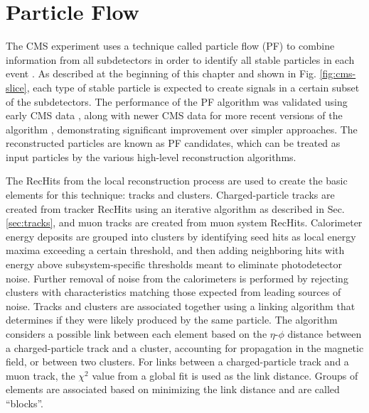 \documentclass[12pt]{thesis}  %
\begin{document}
\section{Particle Flow
\label{sec:particle-flow}}

The CMS experiment uses a technique called particle flow (PF) to combine information from all subdetectors in order to identify all stable particles in each event \cite{CMS-PAS-PFT-09-001}. As described at the beginning of this chapter and shown in Fig. \ref{fig:cms-slice}, each type of stable particle is expected to create signals in a certain subset of the subdetectors. The performance of the PF algorithm was validated using early CMS data \cite{CMS-PAS-PFT-10-002,CMS-PAS-PFT-10-003}, along with newer CMS data for more recent versions of the algorithm \cite{Beaudette:2014cea}, demonstrating significant improvement over simpler approaches. The reconstructed particles are known as PF candidates, which can be treated as input particles by the various high-level reconstruction algorithms.

The RecHits from the local reconstruction process are used to create the basic elements for this technique: tracks and clusters. Charged-particle tracks are created from tracker RecHits using an iterative algorithm as described in Sec. \ref{sec:tracks}, and muon tracks are created from muon system RecHits. Calorimeter energy deposits are grouped into clusters by identifying seed hits as local energy maxima exceeding a certain threshold, and then adding neighboring hits with energy above subsystem-specific thresholds meant to eliminate photodetector noise. Further removal of noise from the calorimeters is performed by rejecting clusters with characteristics matching those expected from leading sources of noise. Tracks and clusters are associated together using a linking algorithm that determines if they were likely produced by the same particle. The algorithm considers a possible link between each element based on the $\eta$-$\phi$ distance between a charged-particle track and a cluster, accounting for propagation in the magnetic field, or between two clusters. For links between a charged-particle track and a muon track, the $\chi^{2}$ value from a global fit is used as the link distance. Groups of elements are associated based on minimizing the link distance and are called ``blocks''.
\end{document}
